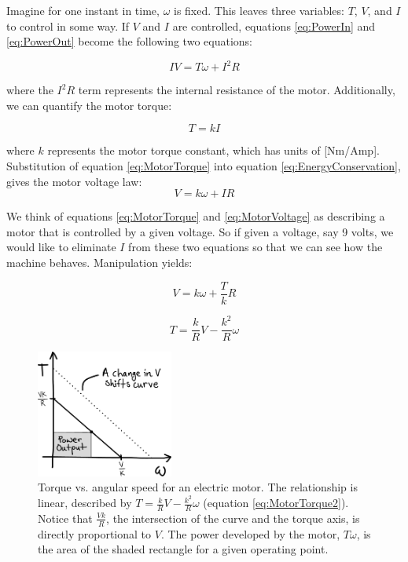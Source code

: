 Imagine for one instant in time, $\omega$ is fixed. This leaves three variables: $T$, $V$, and $I$ to control in some way. If $V$ and $I$ are controlled, equations \ref{eq:PowerIn} and \ref{eq:PowerOut} become the following two equations:

\begin{equation}
IV = T\omega + I^2R
\label{eq:EnergyConservation}
\end{equation}

where the $I^2R$ term represents the internal resistance of the motor. Additionally, we can quantify the motor torque:

\begin{equation}
T = kI
\label{eq:MotorTorque}
\end{equation}

where $k$ represents the motor torque constant, which has units of [Nm/Amp]. Substitution of equation \ref{eq:MotorTorque} into equation \ref{eq:EnergyConservation}, gives the motor voltage law:
\begin{equation}
V = k\omega + IR
\label{eq:MotorVoltage}
\end{equation}

We think of equations \ref{eq:MotorTorque} and \ref{eq:MotorVoltage} as describing a motor that is controlled by a given voltage. So if given a voltage, say 9 volts, we would like to eliminate $I$ from these two equations so that we can see how the machine behaves. Manipulation yields:

\begin{equation}
V = k\omega + \frac{T}{k}R
\label{eq:MotorVoltage2}
\end{equation}

\begin{equation}
T = \frac{k}{R}V - \frac{k^2}{R}\omega
\label{eq:MotorTorque2}
\end{equation}

\begin{figure}[h]		%
\begin{centering}
\includegraphics[width=0.4\textwidth]{Figures/MotorTorqueCurveSketch}\par
\end{centering}
\caption[Plot: Torque vs. Angular Speed for an Electric Motor]{Torque vs. angular speed for an electric motor. The relationship is linear, described by $T = \frac{k}{R}V - \frac{k^2}{R}\omega$ (equation \ref{eq:MotorTorque2}). Notice that $\frac{Vk}{R}$, the intersection of the curve and the torque axis, is directly proportional to $V$. The power developed by the motor, $T\omega$, is the area of the shaded rectangle for a given operating point.}
\label{fig:MotorTorqueCurveSketch}
\end{figure}
%

